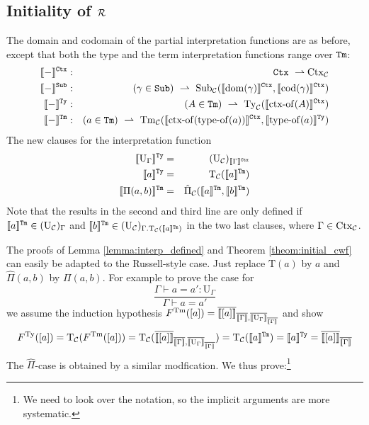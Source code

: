 \documentclass{lmcs}
\def\UU{\mathrm{U}}
\def\Ta{\mathrm{T}}
\def\Pihat{\hat{\Pi}}
\newcommand{\intCtxU}[1]{\llbracket #1 \rrbracket^\RawCtx}
\newcommand{\intSubU}[1]{\llbracket #1 \rrbracket^\RawSub}
\newcommand{\intTyU}[1]{\llbracket #1 \rrbracket^\RawTy}
\newcommand{\intTmU}[1]{\llbracket #1 \rrbracket^\RawTm}
\begin{document}
\subsection{Initiality of $\mathcal{R}$}
The domain and codomain of the partial interpretation functions are as before, except that
both the type and the term interpretation functions range over ${\tt Tm}$:
\begin{eqnarray*}
\intCtxU{-} &:& \RawCtx\ \rightharpoonup \Ctx_\C\\
\intSubU{-}&:& (\gamma \in \RawSub)\ \rightharpoonup \
\Sub_\C(\intCtxU{\domain(\gamma)}, \intCtxU{\codomain(\gamma)})\\
\intTyU{-}&:& (A \in \RawTm)\ \rightharpoonup\ \Ty_\C(\intCtxU{\ctxof(A)})\\
\intTmU{-}&:& (a \in\RawTm)\ \rightharpoonup\
\Tm_\C (\intCtxU{\ctxof(\typeof(a))}, \intTyU{\typeof(a)})
\end{eqnarray*}
The new clauses for the interpretation function
\begin{eqnarray*}
\intTyU{\UU_\Gamma} &=& (\UU_\C)_{\intCtxU{\Gamma}}\\
\intTyU{a} &=& \Ta_\C(\intTmU{a})\\
\intTmU{\Pi(a,b)}&=& \hat{\Pi}_\C(\intTmU{a},\intTmU{b})
\end{eqnarray*}
Note that the results in the second and third line are only defined if $\intTmU{a} \in (\UU_\C)_\Gamma$ and $\intTmU{b} \in (\UU_\C)_{\Gamma.\Ta_\C(\intTmU{a})}$ in the two last clauses, where $\Gamma \in \mathrm{Ctx}_{\mathcal C}$.

The proofs of Lemma \ref{lemma:interp_defined} and Theorem \ref{theom:initial_cwf} can easily be adapted to the Russell-style case. Just replace $\Ta(a)$ by $a$ and $\Pihat(a,b)$ by $\Pi(a,b)$.
For example to prove the case for
$$
\frac{\Gamma \vdash a = a' : \UU_\Gamma}
{\Gamma \vdash a = a' }
$$
we assume the induction hypothesis 
 $F^\Tm([a]) = \iniTm{\iniCtx{\Gamma}}{\iniTy{\iniCtx{\Gamma}}{\UU_\Gamma}}{[a]}$
and show
$$
F^\Ty([a]) = \Ta_\C(F^\Tm([a])) = \Ta_\C(\iniTm{\iniCtx{\Gamma}}{\iniTy{\iniCtx{\Gamma}}{\UU_\Gamma}}{[a]}) = \Ta_\C(\intTmU{a}) = \intTyU{a} = \iniTy{\iniCtx{\Gamma}}{[a]}
$$
%
%
%
%
The $\Pihat$-case is obtained by a similar modfication. We thus prove:\footnote{We need to look over the notation, so the implicit arguments are more systematic.}
\end{document}
